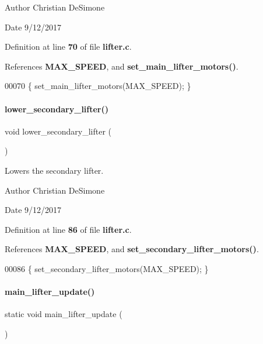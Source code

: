 \begin{DoxyAuthor}{Author}
Christian De\+Simone 
\end{DoxyAuthor}
\begin{DoxyDate}{Date}
9/12/2017 
\end{DoxyDate}


Definition at line \textbf{ 70} of file \textbf{ lifter.\+c}.



References \textbf{ M\+A\+X\+\_\+\+S\+P\+E\+ED}, and \textbf{ set\+\_\+main\+\_\+lifter\+\_\+motors()}.


\begin{DoxyCode}
00070 \{ set_main_lifter_motors(MAX_SPEED); \}
\end{DoxyCode}
\mbox{\label{a00107_af76abbd394bf206ab56fa237d776f2b3}} 
\paragraph{lower\+\_\+secondary\+\_\+lifter()}
{\footnotesize\ttfamily void lower\+\_\+secondary\+\_\+lifter (\begin{DoxyParamCaption}{ }\end{DoxyParamCaption})}



Lowers the secondary lifter. 

\begin{DoxyAuthor}{Author}
Christian De\+Simone 
\end{DoxyAuthor}
\begin{DoxyDate}{Date}
9/12/2017 
\end{DoxyDate}


Definition at line \textbf{ 86} of file \textbf{ lifter.\+c}.



References \textbf{ M\+A\+X\+\_\+\+S\+P\+E\+ED}, and \textbf{ set\+\_\+secondary\+\_\+lifter\+\_\+motors()}.


\begin{DoxyCode}
00086 \{ set_secondary_lifter_motors(MAX_SPEED); \}
\end{DoxyCode}
\mbox{\label{a00107_adfb6207ee1f20953058c8de81ec3386a}} 
\paragraph{main\+\_\+lifter\+\_\+update()}
{\footnotesize\ttfamily static void main\+\_\+lifter\+\_\+update (\begin{DoxyParamCaption}{ }\end{DoxyParamCaption})\hspace{0.3cm}{\ttfamily [static]}}



